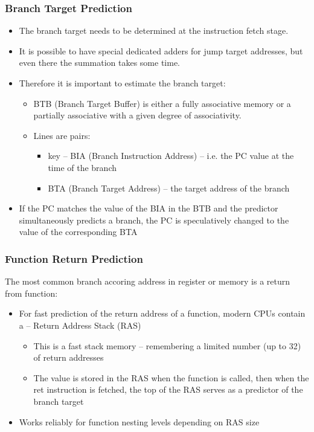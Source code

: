 \documentclass[aspectratio=169]{beamer}
\begin{document}
\begin{frame}
\frametitle{Branch Target Prediction}

\begin{itemize}
\item The branch target needs to be determined at the instruction fetch stage.
\item It is possible to have special dedicated adders for jump target addresses, but even there the summation takes some time.
\item Therefore it is important to estimate the branch target:
\begin{itemize}
\item BTB (Branch Target Buffer) is either a fully associative memory or a partially
associative with a given degree of associativity.
\item Lines are pairs:
\begin{itemize}
\item key -- BIA (Branch Instruction Address) -- i.e. the PC value at the time of the branch
\item BTA (Branch Target Address) -- the target address of the branch
\end{itemize}
\end{itemize}
\item If the PC matches the value of the BIA in the BTB and the predictor simultaneously predicts a branch, the PC is speculatively changed to the value of the corresponding BTA
\end{itemize}
\end{frame}

\begin{frame}
\frametitle{Function Return Prediction}

The most common branch accoring address in register or memory is a return from function:
\begin{itemize}
\item For fast prediction of the return address of a function, modern CPUs contain a -- Return Address Stack (RAS)
\begin{itemize}
\item This is a fast stack memory -- remembering a limited number (up to 32) of return addresses
\item The value is stored in the RAS when the function is called, then when the ret instruction is fetched, the top of the RAS serves as a predictor of the branch target
\end{itemize}
\item Works reliably for function nesting levels depending on RAS size
\end{itemize}
\end{frame}
\end{document}
